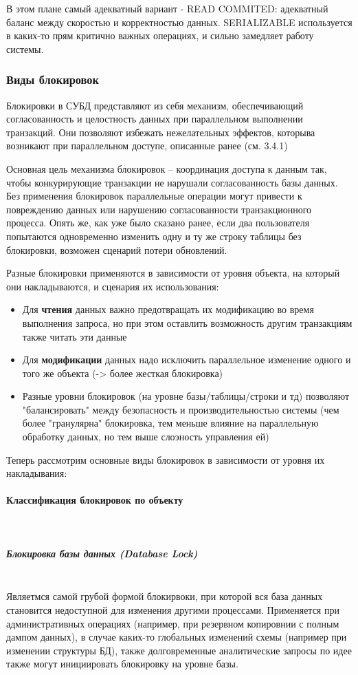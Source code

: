  В этом плане самый адекватный вариант - READ COMMITED: адекватный баланс между скоростью и корректностью данных. SERIALIZABLE используется в каких-то прям критично важных операциях, и сильно замедляет работу системы.
 
 \subsubsection{Виды блокировок}
 
 Блокировки в СУБД представляют из себя механизм, обеспечивающий согласованность и целостность данных при параллельном выполнении транзакций. Они позволяют избежать нежелательных эффектов, которыва возникают при параллельном доступе, описанные ранее (см. 3.4.1)
 
 Основная цель механизма блокировок – координация доступа к данным так, чтобы конкурирующие транзакции не нарушали согласованность базы данных. Без применения блокировок параллельные операции могут привести к повреждению данных или нарушению согласованности транзакционного процесса. Опять же, как уже было сказано ранее, если два пользователя попытаются одновременно изменить одну и ту же строку таблицы без блокировки, возможен сценарий потери обновлений.
 
 Разные блокировки применяются в зависимости от уровня объекта, на который они накладываются, и сценария их использования:
 
 \begin{itemize}
     \item Для \textbf{чтения} данных важно предотвращать их модификацию во время выполнения запроса, но при этом оставлить возможность другим транзакциям также читать эти данные
     \item Для \textbf{модификации} данных надо исключить параллельное изменение одного и того же объекта (-> более жесткая блокировка)
     \item Разные уровни блокировок (на уровне базы/таблицы/строки и тд) позволяют "балансировать" между безопасность и производительностью системы (чем более "гранулярна" блокировка, тем меньше влияние на параллельную обработку данных, но тем выше слоэность управления ей) \autocite[ch.22]{ElmasriNavathe}
 \end{itemize}
 
 Теперь рассмотрим основные виды блокировок в зависимости от уровня их накладывания:
 
 \paragraph{Классификация блокировок по объекту} ~\\
 \subparagraph{Блокировка базы данных (Database Lock)} ~\\
 Являетмся самой грубой формой блокирвоки, при которой вся база данных становится недоступной для изменения другими процессами. Применяется при административных операциях (например, при резервном копировнии с полным дампом данных), в случае каких-то глобальных изменений схемы (например при изменении структуры БД), также долговременные аналитические запросы по идее также могут инициировать блокировку на уровне базы.
 

